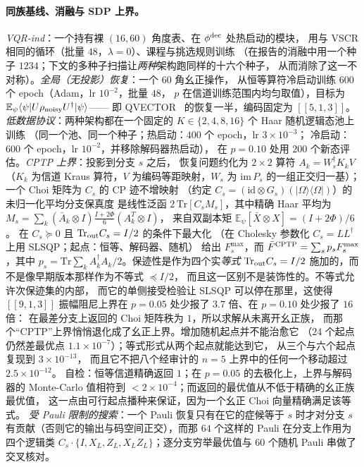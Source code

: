\documentclass[11pt,a4paper]{article}
\newcommand{\ket}[1]{\lvert #1\rangle}
\newcommand{\bra}[1]{\langle #1\rvert}
\newcommand{\code}{[\![5,1,3]\!]}
\begin{document}
\paragraph{同族基线、消融与 SDP 上界。}
\emph{VQR-ind}：一个持有裸 $(16,60)$ 角度表、在 $\phi^{\rm dec}$ 处热启动的模块，
用与 VSCR 相同的循环（批量 $48$，$\lambda=0$）、课程与挑选规则训练
（在报告的消融中用一个种子 $1234$；下文的多种子扫描让\emph{两种}架构跑同样的十六个种子，
从而消除了这一不对称）。\emph{全局（无投影）恢复}：一个 $60$ 角幺正操作，
从恒等算符冷启动训练 $600$ 个 epoch（Adam，lr $10^{-2}$，批量 $48$，
$p$ 在信道训练范围内均匀取值），目标为
$\mathbb{E}_\psi\langle\psi|U\rho_{\rm noisy}U^\dagger|\psi\rangle$——
即 QVECTOR~\cite{johnson_qvector} 的恢复一半，编码固定为 $\code$。
\emph{低数据协议}：两种架构都在一个固定的 $K\in\{2,4,8,16\}$ 个 Haar 随机逻辑态池上训练
（同一个池、同一个种子；热启动：$400$ 个 epoch，lr $3\times10^{-3}$；
冷启动：$600$ 个 epoch，lr $10^{-2}$，并移除解码器热启动），
在 $p=0.10$ 处用 $200$ 个新态评估。\emph{CPTP 上界}：投影到分支 $s$ 之后，
恢复问题约化为 $2\times2$ 算符 $A_k=W_s^\dagger K_k V$
（$K_k$ 为信道 Kraus 算符，$V$ 为编码等距映射，$W_s$ 为
$\mathrm{im}\,P_s$ 的一组正交归一基）；一个 Choi 矩阵为 $C_s$ 的 CP 迹不增映射
（约定 $C_s=(\mathrm{id}\otimes G_s)(\ket\Omega\bra\Omega)$）的未归一化平均分支保真度
是线性泛函 $2\,\mathrm{Tr}[C_s M_s]$，其中精确 Haar 平均为
$M_s=\sum_k(\bar A_k\otimes I)\tfrac{I+2\Phi}{6}(A_k^{T}\otimes I)$，
来自双副本矩 $\mathbb{E}_\psi[\bar X\otimes X]=(I+2\Phi)/6$。
在 $C_s\succeq0$ 且 $\mathrm{Tr}_{\rm out}C_s= I/2$ 的条件下最大化
（在 Cholesky 参数化 $C_s=LL^\dagger$ 上用 SLSQP；起点：恒等、解码器、随机）
给出 $F_s^{\max}$，而 $\bar F^{\rm CPTP}=\sum_s p_s F_s^{\max}$，其中
$p_s=\mathrm{Tr}\sum_k A_k^\dagger A_k/2$。保迹性是作为四个实\emph{等式}
$\mathrm{Tr}_{\rm out}C_s=I/2$ 施加的，而不是像早期版本那样作为不等式 $\preceq I/2$，
而且这一区别不是装饰性的。不等式允许次保迹集的内部，
而它的单侧接受检验让 SLSQP 可以停在那里，这使得 $[\![9,1,3]\!]$
振幅阻尼上界在 $p=0.05$ 处少报了 $3.7$ 倍、在 $p=0.10$ 处少报了 $16$ 倍：
在最差分支上返回的 Choi 矩阵秩为 $1$，所以求解从未离开幺正族，
而那个“CPTP”上界悄悄退化成了幺正上界。增加随机起点并不能治愈它
（$24$ 个起点仍然差最优点 $1.1\times10^{-7}$）；等式形式从两个起点就能达到它，
从三个与六个起点复现到 $3\times10^{-13}$，
而且它不把八个经审计的 $n=5$ 上界中的任何一个移动超过 $2.5\times10^{-12}$。
自检：恒等信道精确返回 $1$；在 $p=0.05$ 的去极化上，上界与解码器的 Monte-Carlo
值相符到 $<2\times10^{-4}$；而返回的最优值从不低于精确的幺正族最优值，
这一点由可行起点播种来保证，因为一个幺正 Choi 向量精确满足该等式。
\emph{受 Pauli 限制的搜索}：一个 Pauli 恢复只有在它的症候等于 $s$ 时才对分支 $s$
有贡献（否则它的输出与码空间正交），而那 $64$ 个这样的 Pauli 在分支上作用为四个逻辑类
$C_s\cdot\{I,X_L,Z_L,X_LZ_L\}$；逐分支穷举最优值与 $60$ 个随机 Pauli 串做了交叉核对。
\end{document}
